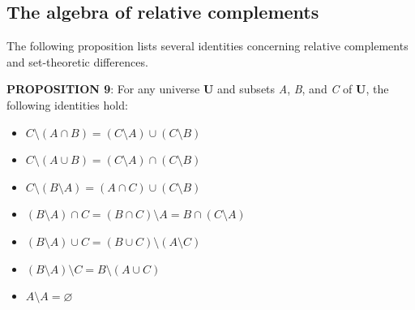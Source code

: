 \subsection{The algebra of relative complements}
\label{sss:thea-709b}




The following proposition lists several identities concerning relative complements and
set-theoretic differences.



\textbf{PROPOSITION 9}: For any universe \textbf{U} and subsets \textit{A}, \textit{B}, and \textit{C} of \textbf{U}, the following identities hold:



\begin{itemize}
    \item $C \setminus (A \cap B) = (C \setminus A) \cup (C \setminus B)$
\end{itemize}

\begin{itemize}
    \item $C \setminus (A \cup B) = (C \setminus A) \cap (C \setminus B)$
\end{itemize}

\begin{itemize}
    \item $C \setminus (B \setminus A) = (A \cap C)\cup(C \setminus B)$
\end{itemize}

\begin{itemize}
    \item $(B \setminus A) \cap C = (B \cap C) \setminus A = B \cap (C \setminus A)$
\end{itemize}

\begin{itemize}
    \item $(B \setminus A) \cup C = (B \cup C) \setminus (A \setminus C)$
\end{itemize}

\begin{itemize}
    \item $(B \setminus A) \setminus C = B \setminus (A \cup C)$
\end{itemize}

\begin{itemize}
    \item $A \setminus A = \varnothing$
\end{itemize}

